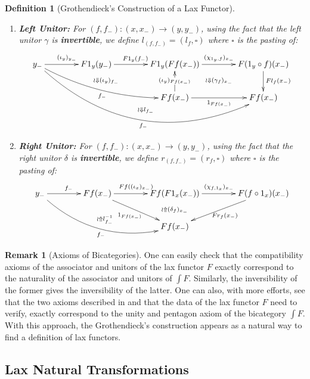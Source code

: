 \documentclass{article}
\numberwithin{equation}{section}
\theoremstyle{definition}
\newtheorem{remark}[equation]{Remark}
\theoremstyle{plain}
\newtheorem{definition}[equation]{Definition}
\begin{document}
\begin{definition}[Grothendieck's Construction of a Lax Functor]
\begin{enumerate}[label = $\bullet$]
\[{{		}}\]
		in which we omit some coherence 2-cells linked to the pseudo-functoriality of $Fh$
		\item \textbf{Left Unitor:} For $(f,f_-):(x, x_-) \to (y, y_-)$, using the fact that the left unitor $\gamma$ is \textbf{invertible}, we define $l_{(f,f_-)} = (l_f, \square)$ where $\square$ is the pasting of:
		\[\xymatrix@C=4em{
			y_- \ar[r]^{(\iota_y)_{y_-}} \ar@/_1pc/[drr]_{f_-} \ar@{{}{ }{}}[drr]|{\wr\Downarrow (\iota_y)_{f_-}} \ar@/_4pc/[drrr]_{f_-} \ar@/_3pc/@{{}{ }{}}[drrr]|{\wr\Downarrow l_{f_-}} & F1_y(y_-) \ar[r]^{F1_y(f_-)} & F1_y(Ff(x_-)) \ar[r]^{(\chi_{1_y,f})_{x_-}} \ar@{}[dr]|{\wr\Downarrow (\gamma_f)_{x_-}} & F(1_y\circ f)(x_-) \ar[d]^{Fl_f(x_-)}\\
			&& Ff(x_-) \ar[u]|{(\iota_y)_{Ff(x_-)}} \ar[r]_{1_{Ff(x_-)}} & Ff(x_-)
		}\]
		\item \textbf{Right Unitor:} For $(f,f_-):(x, x_-) \to (y, y_-)$, using the fact that the right unitor $\delta$ is \textbf{invertible}, we define $r_{(f,f_-)} = (r_f, \square)$ where $\square$ is the pasting of:
		\[\xymatrix@C=4em{
			y_- \ar[r]^{f_-} \ar@/_2pc/[drr]_{f_-} \ar@/_1pc/@{{}{ }{}}[drr]|{\wr\Uparrow l^{-1}_{f_-}} & Ff(x_-) \ar[dr]_{1_{Ff(x_-)}} \ar[r]^{Ff((\iota_x)_{x_-})} & Ff(F1_x(x_-)) \ar[r]^{(\chi_{f,1_x})_{x_-}} \ar@{}[d]|{\wr\Uparrow (\delta_f)_{x_-}} & F(f\circ 1_x)(x_-) \ar[dl]^{Fr_f(x_-)}\\
			&& Ff(x_-)
		}\]
	\end{enumerate}
\end{definition}

\begin{remark}[Axioms of Bicategories] One can easily check that the compatibility axioms of the associator and unitors of the lax functor $F$ exactly correspond to the naturality of the associator and unitors of $\int F$. Similarly, the inversibility of the former gives the inversibility of the latter. One can also, with more efforts, see that the two axioms described in \cite{gordon1995coherence} and \cite{gurski_2013} that the data of the lax functor $F$ need to verify, exactly correspond to the unity and pentagon axiom of the bicategory $\int F$. With this approach, the Grothendieck's construction appears as a natural way to find a definition of lax functors.
\end{remark}

\subsection{Lax Natural Transformations}
\end{document}
